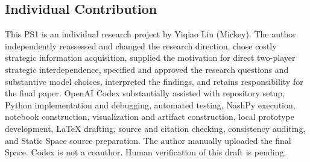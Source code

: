 \documentclass[sigconf,nonacm]{acmart}
\begin{document}
\subsection*{Individual Contribution}
This PS1 is an individual research project by Yiqiao Liu (Mickey). The author independently reassessed and changed the research direction, chose costly strategic information acquisition, supplied the motivation for direct two-player strategic interdependence, specified and approved the research questions and substantive model choices, interpreted the findings, and retains responsibility for the final paper. OpenAI Codex substantially assisted with repository setup, Python implementation and debugging, automated testing, NashPy execution, notebook construction, visualization and artifact construction, local prototype development, LaTeX drafting, source and citation checking, consistency auditing, and Static Space source preparation. The author manually uploaded the final Space. Codex is not a coauthor. Human verification of this draft is pending.



\clearpage\onecolumn
\appendix






\end{document}
